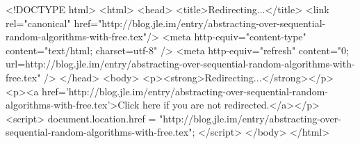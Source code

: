 <!DOCTYPE html>
<html>
<head>
<title>Redirecting...</title>
<link rel="canonical" href="http://blog.jle.im/entry/abstracting-over-sequential-random-algorithms-with-free.tex"/>
<meta http-equiv="content-type" content="text/html; charset=utf-8" />
<meta http-equiv="refresh" content="0; url=http://blog.jle.im/entry/abstracting-over-sequential-random-algorithms-with-free.tex" />
</head>
<body>
  <p><strong>Redirecting...</strong></p>
  <p><a href='http://blog.jle.im/entry/abstracting-over-sequential-random-algorithms-with-free.tex'>Click here if you are not redirected.</a></p>
  <script>
    document.location.href = "http://blog.jle.im/entry/abstracting-over-sequential-random-algorithms-with-free.tex";
  </script>
</body>
</html>
